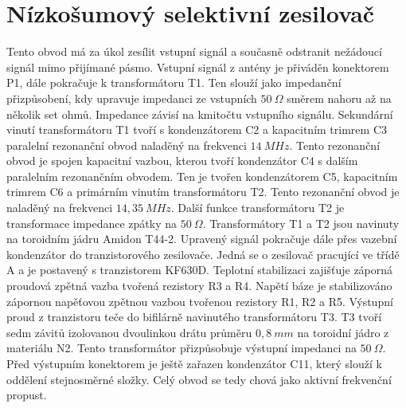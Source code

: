 \clearpage
\section{Nízkošumový selektivní zesilovač}
\indent\indent Tento obvod má za úkol zesílit vstupní signál a současně odstranit nežádoucí signál mimo přijímané pásmo. Vstupní signál z antény je přiváděn konektorem P1, dále pokračuje k transformátoru T1. Ten slouží jako impedanční přizpůsobení, kdy upravuje  impedanci ze vstupních $50~\Omega$ směrem nahoru až na několik set ohmů. Impedance závisí na kmitočtu vstupního signálu. Sekundární vinutí transformátoru T1 tvoří s kondenzátorem C2 a kapacitním trimrem C3 paralelní rezonanční obvod naladěný na frekvenci $14~MHz$. Tento rezonanční obvod je spojen kapacitní vazbou, kterou tvoří kondenzátor C4 s dalším paralelním rezonančním obvodem. Ten je tvořen kondenzátorem C5, kapacitním trimrem C6 a primárním vinutím transformátoru T2. Tento rezonanční obvod je naladěný na frekvenci $14,35~MHz$. Další funkce transformátoru T2 je transformace impedance zpátky na $50~\Omega$. Transformátory T1 a T2 jsou navinuty na toroidním jádru Amidon T44-2. Upravený signál pokračuje dále přes vazební kondenzátor do tranzistorového zesilovače. Jedná se o zesilovač pracující ve třídě A a je postavený s tranzistorem KF630D. Teplotní stabilizaci zajišťuje záporná proudová zpětná vazba tvořená rezistory R3 a R4. Napětí báze je stabilizováno  zápornou napěťovou zpětnou vazbou tvořenou rezistory R1, R2 a R5. Výstupní proud z tranzistoru teče do bifilárně navinutého transformátoru T3. T3 tvoří sedm závitů izolovanou dvoulinkou drátu průměru $0,8~mm$ na toroidní jádro z materiálu N2. Tento transformátor přizpůsobuje výstupní impedanci na $50~\Omega$. Před výstupním konektorem je ještě zařazen kondenzátor C11, který slouží k oddělení stejnosměrné složky. Celý obvod se tedy chová jako aktivní frekvenční propust.


